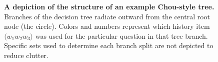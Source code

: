 \documentclass[12pt]{article}
\begin{document}
\begin{figure}
  \centering
  \caption{\textbf{A depiction of the structure of an example
      Chou-style tree.} Branches of the decision tree radiate outward
    from the central root node (the circle). Colors and numbers
    represent which history item $\langle w_1 w_2 w_3 \rangle$ was
    used for the particular question in that tree branch. Specific
    sets used to determine each branch split are not depicted to
    reduce clutter.}
  \label{fig:chou-tree}
\end{figure}
\end{document}
